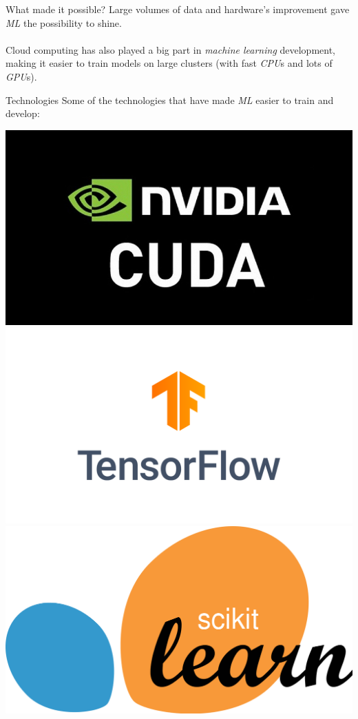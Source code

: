 \documentclass[dvipsnames, handout]{beamer}
\newcommand{\1}{\mathds{1}}	%
\begin{document}
\begin{frame}{What made it possible?}
Large volumes of data and hardware's improvement gave \emph{ML} the possibility to shine.\\
\pause
\\
Cloud computing has also played a big part in \emph{machine learning} development, making it easier to train models on large clusters (with fast \emph{CPU}s and lots of \emph{GPU}s).
\pause
\end{frame}

\begin{frame}{Technologies}
Some of the technologies that have made \emph{ML} easier to train and develop:
\pause
\begin{center}
\includegraphics[scale=0.2]{presentation/cuda.jpg}
\includegraphics[scale=0.12]{presentation/tf.png}  
\includegraphics[scale=0.1]{presentation/scikit.png}  
\end{center}
\pause
\end{frame}
\end{document}

